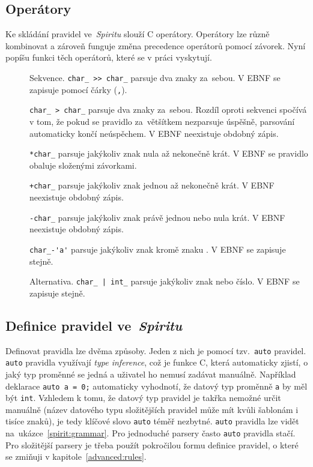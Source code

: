 \documentclass[thesis=B,czech,hidelinks]{FITthesis}[2019/03/06]
\newcommand{\Rplus}{\protect\hspace{-.1em}\protect\raisebox{.35ex}{\smaller{\smaller\textbf{+}}}}
\newcommand{\Cpp}{\mbox{C\Rplus\Rplus}\xspace}
\begin{document}
\subsection{Operátory}
Ke skládání pravidel ve~\textit{Spiritu} slouží \Cpp{} operátory. Operátory lze různě kombinovat a zároveň funguje změna precedence operátorů pomocí závorek. Nyní popíšu funkci těch operátorů, které se v práci vyskytují.
\begin{description}
    \item[\uv{\texttt{>>}}]{Sekvence. \verb¨char_ >> char_¨ parsuje dva znaky za~sebou. V EBNF se zapisuje pomocí čárky (\texttt{,}).}
    \item[\uv{\texttt{>}}]{\verb¨char_ > char_¨ parsuje dva znaky za~sebou. Rozdíl oproti sekvenci spočívá v tom, že pokud se pravidlo za~většítkem nezparsuje úspěšně, parsování automaticky končí neúspěchem. V EBNF neexistuje obdobný zápis.}
    \item[\uv{\texttt{*}}]{\verb¨*char_¨ parsuje jakýkoliv znak nula až nekonečně krát. V EBNF se pravidlo obaluje složenými závorkami.}
    \item[\uv{\texttt{+}}]{\verb¨+char_¨ parsuje jakýkoliv znak jednou až nekonečně krát. V EBNF ne\-existuje obdobný zápis.}
    \item[]{\verb¨-char_¨ parsuje jakýkoliv znak právě jednou nebo nula krát. V EBNF neexistuje obdobný zápis.}
    \item[]{\verb¨char_-'a'¨ parsuje jakýkoliv znak kromě znaku . V EBNF se zapisuje stejně.}
    \item[\uv{\texttt{|}}]{Alternativa. \verb¨char_ | int_¨ parsuje jakýkoliv znak nebo číslo. V EBNF se zapisuje stejně.}
\end{description}

\subsection{Definice pravidel ve~\textit{Spiritu}}
Definovat pravidla lze dvěma způsoby. Jeden z nich je pomocí tzv.\ \texttt{auto} pravidel. \texttt{auto} pravidla využívají \textit{type inference}, což je funkce \Cpp{}, která automaticky zjistí, o jaký typ proměnné se jedná a uživatel ho nemusí zadávat manuálně. Například deklarace \verb¨auto a = 0;¨ automaticky vyhodnotí, že datový typ proměnně \texttt{a} by měl být \texttt{int}. Vzhledem k tomu, že datový typ pravidel je takřka nemožné určit manuálně (název datového typu složitějších pravidel může mít kvůli šablonám i tisíce znaků), je tedy klíčové slovo \texttt{auto} téměř nezbytné. \texttt{auto} pravidla lze vidět na~ukázce~\ref{spirit:grammar}. Pro jednoduché parsery často \texttt{auto} pravidla stačí. Pro složitější parsery je třeba použít pokročilou formu definice pravidel, o které se zmiňuji v kapitole~\ref{advanced:rules}.
\end{document}

